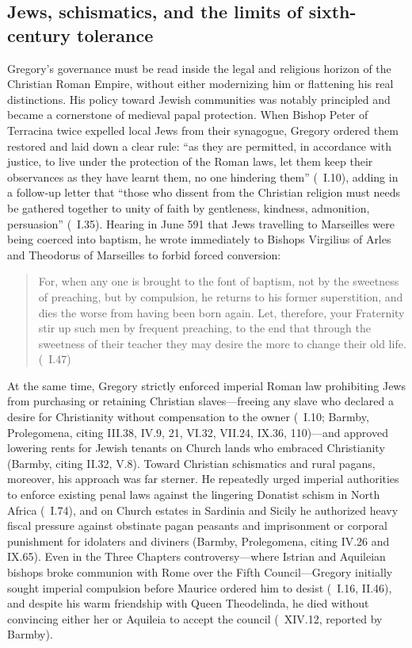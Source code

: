 \subsection{Jews, schismatics, and the limits of sixth-century tolerance}

Gregory's governance must be read inside the legal and religious horizon of the
Christian Roman Empire, without either modernizing him or flattening his real
distinctions. His policy toward Jewish communities was notably principled and
became a cornerstone of medieval papal protection. When Bishop Peter of
Terracina twice expelled local Jews from their synagogue, Gregory ordered them
restored and laid down a clear rule: ``as they are permitted, in accordance
with justice, to live under the protection of the Roman laws, let them keep
their observances as they have learnt them, no one hindering them''
(\ I.10), adding in a follow-up letter that ``those who dissent from
the Christian religion must needs be gathered together to unity of faith by
gentleness, kindness, admonition, persuasion'' (\ I.35). Hearing in
June 591 that Jews travelling to Marseilles were being coerced into baptism, he
wrote immediately to Bishops Virgilius of Arles and Theodorus of Marseilles to
forbid forced conversion:

\begin{quote}
For, when any one is brought to the font of baptism, not by the sweetness of
preaching, but by compulsion, he returns to his former superstition, and dies
the worse from having been born again. Let, therefore, your Fraternity stir up
such men by frequent preaching, to the end that through the sweetness of their
teacher they may desire the more to change their old life. (\ I.47)
\end{quote}

At the same time, Gregory strictly enforced imperial Roman law prohibiting Jews
from purchasing or retaining Christian slaves---freeing any slave who declared
a desire for Christianity without compensation to the owner (\ I.10;
Barmby, Prolegomena, citing III.38, IV.9, 21, VI.32, VII.24, IX.36, 110)---and
approved lowering rents for Jewish tenants on Church lands who embraced
Christianity (Barmby, citing II.32, V.8). Toward Christian schismatics and
rural pagans, moreover, his approach was far sterner. He repeatedly urged
imperial authorities to enforce existing penal laws against the lingering
Donatist schism in North Africa (\ I.74), and on Church estates in
Sardinia and Sicily he authorized heavy fiscal pressure against obstinate pagan
peasants and imprisonment or corporal punishment for idolaters and diviners
(Barmby, Prolegomena, citing IV.26 and IX.65). Even in the Three Chapters
controversy---where Istrian and Aquileian bishops broke communion with Rome
over the Fifth Council---Gregory initially sought imperial compulsion before
Maurice ordered him to desist (\ I.16, II.46), and despite his warm
friendship with Queen Theodelinda, he died without convincing either her or
Aquileia to accept the council (\ XIV.12, reported by Barmby).

